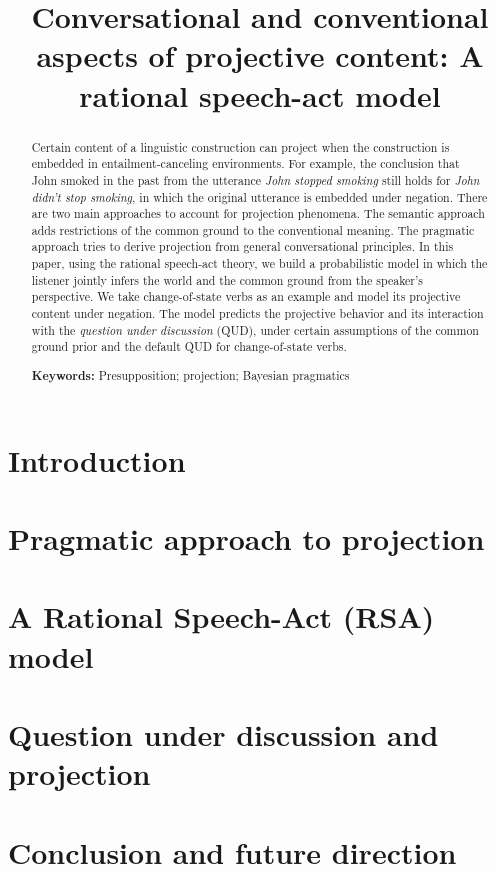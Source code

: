 \documentclass[10pt,letterpaper]{article}
\title{Conversational and conventional aspects of projective content: 
 A rational speech-act model}
\author{}
\begin{document}
\maketitle
 
\begin{abstract}
Certain content of a linguistic construction can project when the construction is embedded in entailment-canceling environments.
 For example, the conclusion that John smoked in the past from the utterance \emph{John stopped smoking} 
 still holds for \emph{John didn't stop smoking}, in which the original utterance is 
 embedded under negation. 
 There are two main approaches to account for projection phenomena. 
 The semantic approach adds restrictions of the common ground to the conventional meaning.
 The pragmatic approach tries to derive projection from general conversational principles. 
 In this paper, using the rational speech-act theory, we build a probabilistic model in which the listener 
  jointly infers the world and the common ground from the speaker's perspective. 
 We take change-of-state verbs as an example and model its projective content under negation. 
 The model predicts the projective behavior and its interaction with 
  the \emph{question under discussion} (QUD), under certain assumptions of the 
  common ground prior and the default QUD for change-of-state verbs.

\textbf{Keywords:} 
Presupposition; projection; Bayesian pragmatics
\end{abstract}

\section{Introduction}
\label{sec:Intro}


\section{Pragmatic approach to projection}
\label{sec:Ex}


\section{A Rational Speech-Act (RSA) model}
\label{sec:RSA}


\section{Question under discussion and projection}
\label{sec:Discussion}


\section{Conclusion and future direction}
\label{sec:Conclusion}









\setlength{\bibleftmargin}{.125in}
\setlength{\bibindent}{-\bibleftmargin}


\end{document}
